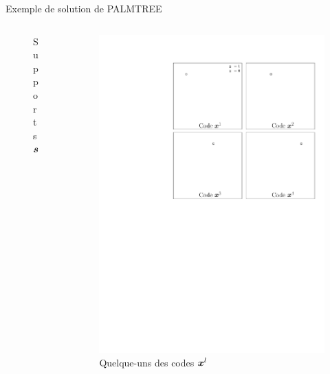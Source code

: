 \begin{frame}{Exemple de solution de PALMTREE}
\begin{columns}
\begin{column}{0.32\textwidth}
\begin{figure}
		\caption{Supports $\bm{s}$}
\end{figure} \end{column}
\begin{column}{0.32\textwidth} \begin{figure}\centering
	\includegraphics[width=\textwidth]{figures/tree-learn-setup/codes.pdf} \caption{Quelque-uns des codes $\bm{x}^l$}
\end{figure} \end{column}
\end{columns}
\end{frame}


